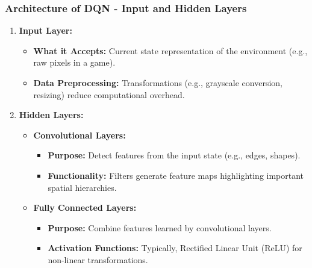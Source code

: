 \documentclass{beamer}
\begin{document}
\begin{frame}[fragile]
    \frametitle{Architecture of DQN - Input and Hidden Layers}
    \begin{enumerate}
        \item \textbf{Input Layer:}
        \begin{itemize}
            \item \textbf{What it Accepts:} Current state representation of the environment (e.g., raw pixels in a game).
            \item \textbf{Data Preprocessing:} Transformations (e.g., grayscale conversion, resizing) reduce computational overhead.
        \end{itemize}

        \item \textbf{Hidden Layers:}
        \begin{itemize}
            \item \textbf{Convolutional Layers:}
            \begin{itemize}
                \item \textbf{Purpose:} Detect features from the input state (e.g., edges, shapes).
                \item \textbf{Functionality:} Filters generate feature maps highlighting important spatial hierarchies.
            \end{itemize}

            \item \textbf{Fully Connected Layers:}
            \begin{itemize}
                \item \textbf{Purpose:} Combine features learned by convolutional layers.
                \item \textbf{Activation Functions:} Typically, Rectified Linear Unit (ReLU) for non-linear transformations.
            \end{itemize}
        \end{itemize}
    \end{enumerate}
\end{frame}
\end{document}
